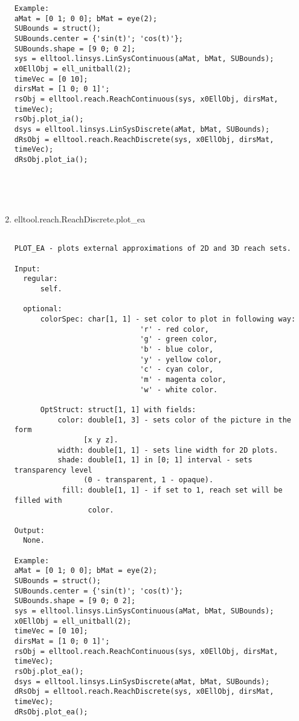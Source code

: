 \begin{enumerate}
\begin{lstlisting}
Example:
aMat = [0 1; 0 0]; bMat = eye(2);
SUBounds = struct();
SUBounds.center = {'sin(t)'; 'cos(t)'};
SUBounds.shape = [9 0; 0 2];
sys = elltool.linsys.LinSysContinuous(aMat, bMat, SUBounds);
x0EllObj = ell_unitball(2);
timeVec = [0 10];
dirsMat = [1 0; 0 1]';
rsObj = elltool.reach.ReachContinuous(sys, x0EllObj, dirsMat, timeVec);
rsObj.plot_ia();
dsys = elltool.linsys.LinSysDiscrete(aMat, bMat, SUBounds);
dRsObj = elltool.reach.ReachDiscrete(sys, x0EllObj, dirsMat, timeVec);
dRsObj.plot_ia();





\end{lstlisting}
\fontfamily{\familydefault}
\selectfont
\item {elltool.reach.ReachDiscrete.plot\_ea}
\selectfont
\begin{lstlisting}

PLOT_EA - plots external approximations of 2D and 3D reach sets.

Input:
  regular:
      self.

  optional:
      colorSpec: char[1, 1] - set color to plot in following way:
                             'r' - red color,
                             'g' - green color,
                             'b' - blue color,
                             'y' - yellow color,
                             'c' - cyan color,
                             'm' - magenta color,
                             'w' - white color.

      OptStruct: struct[1, 1] with fields:
          color: double[1, 3] - sets color of the picture in the form
                [x y z].
          width: double[1, 1] - sets line width for 2D plots.
          shade: double[1, 1] in [0; 1] interval - sets transparency level
                (0 - transparent, 1 - opaque).
           fill: double[1, 1] - if set to 1, reach set will be filled with
                 color.

Output:
  None.

Example:
aMat = [0 1; 0 0]; bMat = eye(2);
SUBounds = struct();
SUBounds.center = {'sin(t)'; 'cos(t)'};
SUBounds.shape = [9 0; 0 2];
sys = elltool.linsys.LinSysContinuous(aMat, bMat, SUBounds);
x0EllObj = ell_unitball(2);
timeVec = [0 10];
dirsMat = [1 0; 0 1]';
rsObj = elltool.reach.ReachContinuous(sys, x0EllObj, dirsMat, timeVec);
rsObj.plot_ea();
dsys = elltool.linsys.LinSysDiscrete(aMat, bMat, SUBounds);
dRsObj = elltool.reach.ReachDiscrete(sys, x0EllObj, dirsMat, timeVec);
dRsObj.plot_ea();






\end{lstlisting}
\end{enumerate}
